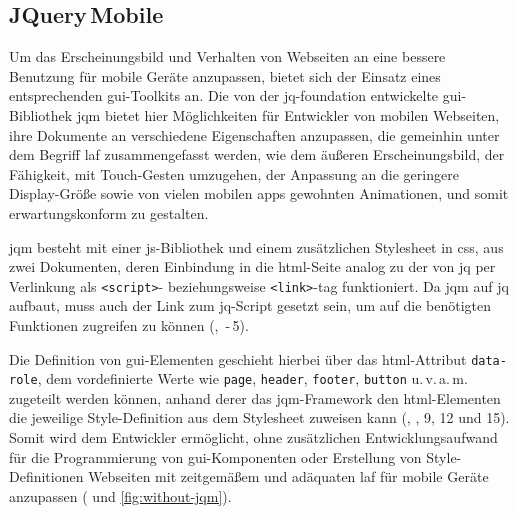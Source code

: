 \subsection{JQuery\,Mobile}

Um das Erscheinungsbild und Verhalten von Webseiten an eine bessere Benutzung für mobile Geräte anzupassen, bietet sich der Einsatz eines entsprechenden \gls{gui}-Toolkits an. 
Die von der \gls{jq-foundation} entwickelte \gls{gui}-Bibliothek \gls{jqm} bietet hier Möglichkeiten für Entwickler von mobilen Webseiten, ihre Dokumente an verschiedene Eigenschaften anzupassen, die gemeinhin unter dem Begriff \gls{laf} zusammengefasst werden, wie dem äußeren Erscheinungsbild, der Fähigkeit, mit Touch-Gesten umzugehen, der Anpassung an die geringere Display-Größe sowie von vielen mobilen \glspl{app} gewohnten Animationen, und somit erwartungskonform zu gestalten.

\Gls{jqm} besteht mit einer \gls{js}-Bibliothek und einem zusätzlichen Stylesheet in \gls{css}, aus zwei Dokumenten, deren Einbindung in die \gls{html}-Seite analog zu der von \gls{jq} per Verlinkung als \lstinline|<script>|- beziehungsweise \lstinline|<link>|-\gls{tag} funktioniert.
Da \gls{jqm} auf \gls{jq} aufbaut, muss auch der Link zum \gls{jq}-Script gesetzt sein, um auf die benötigten Funktionen zugreifen zu können (, \,-\,5).

\par\noindent\begin{minipage}{\linewidth}

\end{minipage}\par\addvspace{\topskip}
	
Die Definition von \gls{gui}-Elementen geschieht hierbei über das \gls{html}-Attribut \lstinline|data-role|, dem vordefinierte Werte wie \lstinline|page|, \lstinline|header|, \lstinline|footer|, \lstinline|button| u.\,v.\,a.\,m. zugeteilt werden können, anhand derer das \gls{jqm}-Framework den \gls{html}-Elementen die jeweilige Style-Definition aus dem Stylesheet zuweisen kann (, , 9, 12 und 15).
Somit wird dem Entwickler ermöglicht, ohne zusätzlichen Entwicklungsaufwand für die Programmierung von \gls{gui}-Komponenten oder Erstellung von Style-Definitionen Webseiten mit zeitgemäßem und adäquaten \gls{laf} für mobile Geräte anzupassen ( und \ref{fig:without-jqm}).

